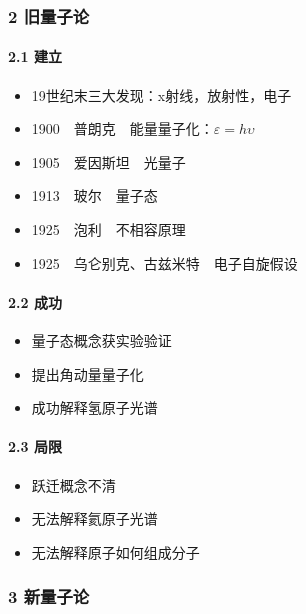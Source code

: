 \documentclass[UTF8,twocolumn]{ctexart}
\providecommand{\tightlist}{%
  \setlength{\itemsep}{0pt}\setlength{\parskip}{0pt}}
\let\oldparagraph\paragraph
\renewcommand{\paragraph}[1]{\oldparagraph{#1}\mbox{}}
\begin{document}
\hypertarget{ux65e7ux91cfux5b50ux8bba}{%
\subsubsection{2 旧量子论}\label{ux65e7ux91cfux5b50ux8bba}}

\hypertarget{ux5efaux7acb}{%
\paragraph{{ }2.1 建立}\label{ux5efaux7acb}}

\begin{itemize}
\tightlist
\item
  19世纪末三大发现：x射线，放射性，电子
\item
  1900 普朗克 能量量子化：\(\varepsilon=h\upsilon\)
\item
  1905 爱因斯坦 光量子
\item
  1913 玻尔 量子态
\item
  1925 泡利 不相容原理
\item
  1925 乌仑别克、古兹米特 电子自旋假设
\end{itemize}

\hypertarget{ux6210ux529f-1}{%
\paragraph{{ }2.2 成功}\label{ux6210ux529f-1}}

\begin{itemize}
\tightlist
\item
  量子态概念获实验验证
\item
  提出角动量量子化
\item
  成功解释氢原子光谱
\end{itemize}

\hypertarget{ux5c40ux9650}{%
\paragraph{{ }2.3 局限}\label{ux5c40ux9650}}

\begin{itemize}
\tightlist
\item
  跃迁概念不清
\item
  无法解释氦原子光谱
\item
  无法解释原子如何组成分子
\end{itemize}

\hypertarget{ux65b0ux91cfux5b50ux8bba}{%
\subsubsection{3 新量子论}\label{ux65b0ux91cfux5b50ux8bba}}
\end{document}
